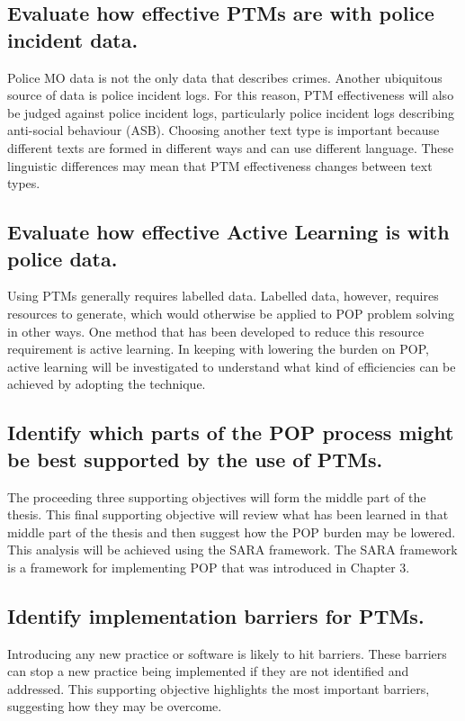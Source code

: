 \subsection{Evaluate how effective PTMs are with police incident data.} Police MO data is not the only data that describes crimes. Another ubiquitous source of data is police incident logs. For this reason, PTM effectiveness will also be judged against police incident logs, particularly police incident logs describing anti-social behaviour (ASB). Choosing another text type is important because different texts are formed in different ways and can use different language. These linguistic differences may mean that PTM effectiveness changes between text types.

\subsection{Evaluate how effective Active Learning is with police data.} Using PTMs generally requires labelled data. Labelled data, however, requires resources to generate, which would otherwise be applied to POP problem solving in other ways. One method that has been developed to reduce this resource requirement is active learning. In keeping with lowering the burden on POP, active learning will be investigated to understand what kind of efficiencies can be achieved by adopting the technique.

\subsection{Identify which parts of the POP process might be best supported by the use of PTMs.} The proceeding three supporting objectives will form the middle part of the thesis. This final supporting objective will review what has been learned in that middle part of the thesis and then suggest how the POP burden may be lowered. This analysis will be achieved using the SARA framework. The SARA framework is a framework for implementing POP that was introduced in Chapter 3.

\subsection{Identify implementation barriers for PTMs.}Introducing any new practice or software is likely to hit barriers. These barriers can stop a new practice being implemented if they are not identified and addressed. This supporting objective highlights the most important barriers, suggesting how they may be overcome. 




